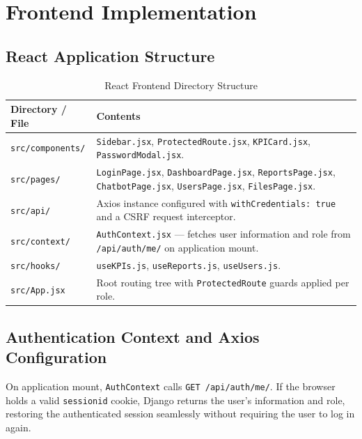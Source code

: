 \section{Frontend Implementation}
\begin{sloppypar}

\subsection{React Application Structure}

\begin{table}[H]
\centering
\caption{React Frontend Directory Structure}
\label{tab:react_structure}
\renewcommand{\arraystretch}{1.5}
\begin{tabular}{|l|p{9cm}|}
\hline
\rowcolor{blue!20}
\textbf{Directory / File} & \textbf{Contents} \\
\hline
\texttt{src/components/} &
  \texttt{Sidebar.jsx}, \texttt{ProtectedRoute.jsx}, \texttt{KPICard.jsx},
  \texttt{PasswordModal.jsx}. \\
\hline
\rowcolor{gray!10}
\texttt{src/pages/} &
  \texttt{LoginPage.jsx}, \texttt{DashboardPage.jsx},
  \texttt{ReportsPage.jsx}, \texttt{ChatbotPage.jsx},
  \texttt{UsersPage.jsx}, \texttt{FilesPage.jsx}. \\
\hline
\texttt{src/api/} &
  Axios instance configured with \texttt{withCredentials:~true} and a
  CSRF request interceptor. \\
\hline
\rowcolor{gray!10}
\texttt{src/context/} &
  \texttt{AuthContext.jsx} --- fetches user information and role from
  \texttt{/api/auth/me/} on application mount. \\
\hline
\texttt{src/hooks/} &
  \texttt{useKPIs.js}, \texttt{useReports.js}, \texttt{useUsers.js}. \\
\hline
\rowcolor{gray!10}
\texttt{src/App.jsx} &
  Root routing tree with \texttt{ProtectedRoute} guards applied per
  role. \\
\hline
\end{tabular}
\end{table}

\subsection{Authentication Context and Axios Configuration}

On application mount, \texttt{AuthContext} calls
\texttt{GET /api/auth/me/}. If the browser holds a valid \texttt{sessionid}
cookie, Django returns the user's information and role, restoring the
authenticated session seamlessly without requiring the user to log in
again.


\end{sloppypar}
